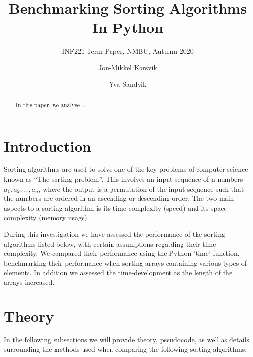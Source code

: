 \documentclass[sigconf, nonacm, natbib, screen, balance=False]{acmart}
\begin{document}
\title{Benchmarking Sorting Algorithms In Python}
\subtitle{INF221 Term Paper, NMBU, Autumn 2020}

\author{Jon-Mikkel Korsvik}
\affiliation{}  %

\author{Yva Sandvik}

\begin{abstract}
  In this paper, we analyse \dots 
\end{abstract}

\maketitle

\section{Introduction}\label{sec:intro}

Sorting algorithms are used to solve one of the key problems of computer science known as “The sorting problem”. This involves an input sequence of n numbers $a_1, a_2, … , a_n$, where the output is a permutation of the input sequence such that the numbers are ordered in an ascending or descending order. The two main aspects to a sorting algorithm is its time complexity (speed) and its space complexity (memory usage).

During this investigation we have assessed the performance of the sorting algorithms listed below, with certain assumptions regarding their time complexity. We compared their performance using the Python 'time' function, benchmarking their performance when sorting arrays containing various types of elements. In addition we assessed the time-development as the length of the arrays increased.  

\section{Theory}\label{sec:theory}

In the following subsections we will provide theory, pseudocode, as well as details surrounding the methods used when comparing the following sorting algorithms: 
\end{document}
